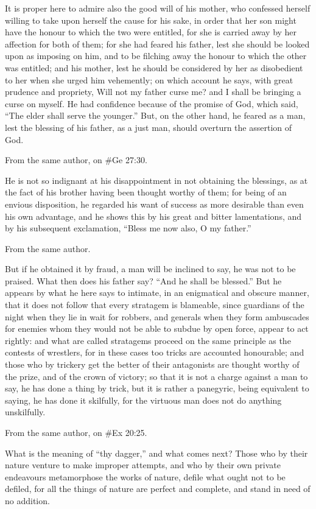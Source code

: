 It is proper here to admire also the good will of his mother, who confessed herself willing to take upon
herself the cause for his sake, in order that her son might have the honour to which the two were
entitled, for she is carried away by her affection for both of them; for she had feared his father, lest she
should be looked upon as imposing on him, and to be filching away the honour to which the other was
entitled; and his mother, lest he should be considered by her as disobedient to her when she urged him
vehemently; on which account he says, with great prudence and propriety, Will not my father curse me?
and I shall be bringing a curse on myself. He had confidence because of the promise of God, which said,
``The elder shall serve the younger.'' But, on the other hand, he feared as a man, lest the blessing of his
father, as a just man, should overturn the assertion of God.

From the same author, on \#Ge 27:30.

He is not so indignant at his disappointment in not obtaining the blessings, as at the fact of his brother
having been thought worthy of them; for being of an envious disposition, he regarded his want of
success as more desirable than even his own advantage, and he shows this by his great and bitter
lamentations, and by his subsequent exclamation, ``Bless me now also, O my father.''

From the same author.

But if he obtained it by fraud, a man will be inclined to say, he was not to be praised. What then does
his father say? ``And he shall be blessed.'' But he appears by what he here says to intimate, in an
enigmatical and obscure manner, that it does not follow that every stratagem is blameable, since
guardians of the night when they lie in wait for robbers, and generals when they form ambuscades for
enemies whom they would not be able to subdue by open force, appear to act rightly: and what are
called stratagems proceed on the same principle as the contests of wrestlers, for in these cases too tricks
are accounted honourable; and those who by trickery get the better of their antagonists are thought
worthy of the prize, and of the crown of victory; so that it is not a charge against a man to say, he has
done a thing by trick, but it is rather a panegyric, being equivalent to saying, he has done it skilfully, for
the virtuous man does not do anything unskilfully.

From the same author, on \#Ex 20:25.

What is the meaning of ``thy dagger,'' and what comes next? Those who by their nature venture to make
improper attempts, and who by their own private endeavours metamorphose the works of nature, defile
what ought not to be defiled, for all the things of nature are perfect and complete, and stand in need of
no addition.

